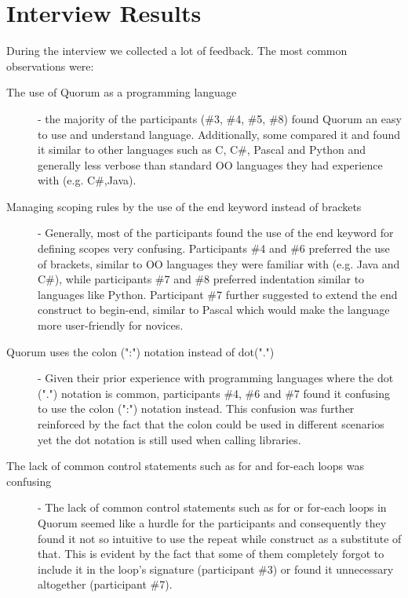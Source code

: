 \section{Interview Results}
During the interview we collected a lot of feedback. The most common observations were:

\begin{description}
\item[The use of Quorum as a programming language] - the majority of the participants (\#3, \#4, \#5, \#8) found Quorum an easy to use and understand language. Additionally, some compared it and found it similar to other languages such as C, C\#, Pascal and Python and generally less verbose than standard OO languages they had experience with (e.g. C\#,Java). 
\item[Managing scoping rules by the use of the end keyword instead of brackets] - Generally, most of the participants found the use of the end keyword for defining scopes very confusing. Participants \#4 and \#6 preferred the use of brackets, similar to OO languages they were familiar with (e.g. Java and C\#), while participants \#7 and \#8 preferred indentation similar to languages like Python. Participant \#7 further suggested to extend the end construct to begin-end, similar to Pascal which would make the language more user-friendly for novices. 
\item[Quorum uses the colon (":") notation instead of dot(".")] - Given their prior experience with programming languages where the dot (".") notation is common, participants \#4, \#6 and \#7 found it confusing to use the  colon (":") notation instead. This confusion was further reinforced by the fact that the colon could be used in different scenarios yet the dot notation is still used when calling libraries.
\item[The lack of common control statements such as for and for-each loops was confusing] - The lack of common control statements such as for or for-each loops in Quorum seemed like a hurdle for the participants and consequently they found it not so intuitive to use the repeat while construct as a substitute of that. This is evident by the fact that some of them completely forgot to include it in the loop's signature (participant \#3) or found it unnecessary altogether (participant \#7).
\end{description}